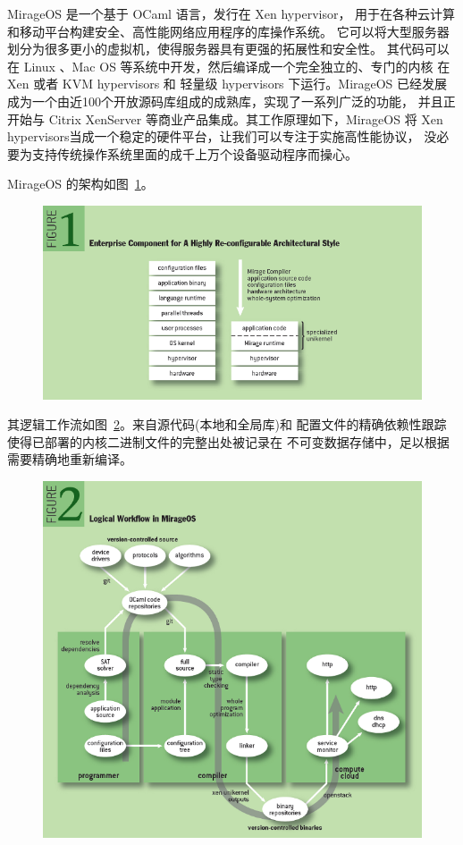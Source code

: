 \documentclass[UTF8,fontset=none,linespread=1.15]{ctexart}
\begin{document}
MirageOS 是一个基于 OCaml 语言，发行在 Xen hypervisor，
用于在各种云计算和移动平台构建安全、高性能网络应用程序的库操作系统。
它可以将大型服务器划分为很多更小的虚拟机，使得服务器具有更强的拓展性和安全性。
其代码可以在 Linux 、Mac OS 等系统中开发，然后编译成一个完全独立的、专门的内核
在 Xen 或者 KVM hypervisors 和 轻量级 hypervisors 下运行。MirageOS
已经发展成为一个由近100个开放源码库组成的成熟库，实现了一系列广泛的功能，
并且正开始与 Citrix XenServer 等商业产品集成。其工作原理如下，MirageOS
将 Xen hypervisors当成一个稳定的硬件平台，让我们可以专注于实施高性能协议，
没必要为支持传统操作系统里面的成千上万个设备驱动程序而操心。

MirageOS 的架构如图\ \ref{fig:mirage-fig1}。
\begin{figure}[!hbt]
\includegraphics[width=\linewidth]{pictures/figure1.png}
\caption{}\label{fig:mirage-fig1}
\end{figure}

其逻辑工作流如图\ \ref{fig:mirage-fig2}。来自源代码(本地和全局库)和
配置文件的精确依赖性跟踪使得已部署的内核二进制文件的完整出处被记录在
不可变数据存储中，足以根据需要精确地重新编译。

\begin{figure}[!hbt]
\includegraphics[width=\linewidth]{pictures/figure2.png}
\caption{}\label{fig:mirage-fig2}
\end{figure}
\end{document}
